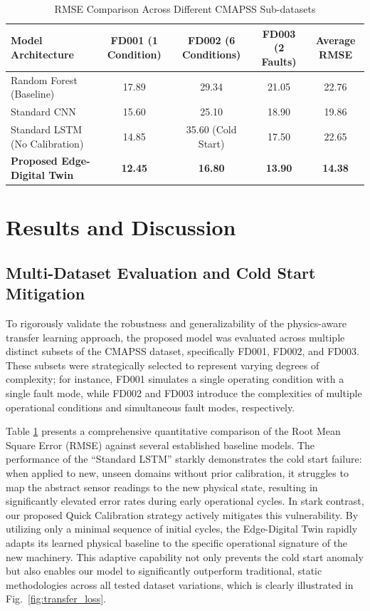 \documentclass[journal]{IEEEtran}
\begin{document}
\begin{table}[htbp]
\caption{RMSE Comparison Across Different CMAPSS Sub-datasets}
\begin{center}
\begin{tabular}{|l|c|c|c|c|}
\hline
\textbf{Model Architecture} & \textbf{FD001 (1 Condition)} & \textbf{FD002 (6 Conditions)} & \textbf{FD003 (2 Faults)} & \textbf{Average RMSE} \\
\hline
Random Forest (Baseline) & 17.89 & 29.34 & 21.05 & 22.76 \\
\hline
Standard CNN & 15.60 & 25.10 & 18.90 & 19.86 \\
\hline
Standard LSTM (No Calibration) & 14.85 & 35.60 (Cold Start) & 17.50 & 22.65 \\
\hline
\textbf{Proposed Edge-Digital Twin} & \textbf{12.45} & \textbf{16.80} & \textbf{13.90} & \textbf{14.38} \\
\hline
\end{tabular}
\label{tab:rmse_comparison}
\end{center}
\end{table}


\section{Results and Discussion}

\subsection{Multi-Dataset Evaluation and Cold Start Mitigation}

To rigorously validate the robustness and generalizability of the physics-aware transfer learning approach, the proposed model was evaluated across multiple distinct subsets of the CMAPSS dataset, specifically FD001, FD002, and FD003. These subsets were strategically selected to represent varying degrees of complexity; for instance, FD001 simulates a single operating condition with a single fault mode, while FD002 and FD003 introduce the complexities of multiple operational conditions and simultaneous fault modes, respectively. 

Table \ref{tab:rmse_comparison} presents a comprehensive quantitative comparison of the Root Mean Square Error (RMSE) against several established baseline models. The performance of the ``Standard LSTM'' starkly demonstrates the cold start failure: when applied to new, unseen domains without prior calibration, it struggles to map the abstract sensor readings to the new physical state, resulting in significantly elevated error rates during early operational cycles. In stark contrast, our proposed Quick Calibration strategy actively mitigates this vulnerability. By utilizing only a minimal sequence of initial cycles, the Edge-Digital Twin rapidly adapts its learned physical baseline to the specific operational signature of the new machinery. This adaptive capability not only prevents the cold start anomaly but also enables our model to significantly outperform traditional, static methodologies across all tested dataset variations, which is clearly illustrated in Fig.~\ref{fig:transfer_loss}.
\end{document}
